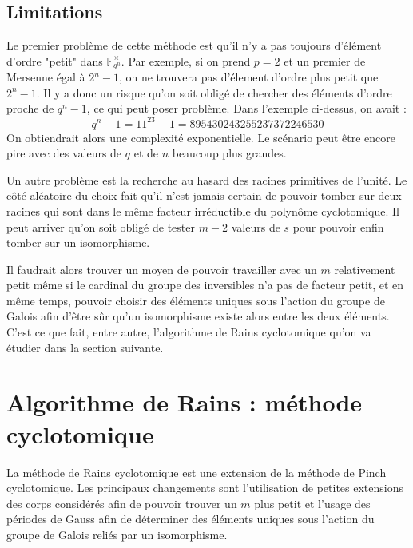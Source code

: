 \documentclass[a4paper]{article} %
\numberwithin{section}{part}
\numberwithin{equation}{section}
\newcommand\GF[1]{\mathbb{F}_{#1}}
\begin{document}
\subsection{Limitations}
Le premier problème de cette méthode est qu'il n'y a pas toujours d'élément
d'ordre "petit" dans $\GF{q^n}^{\times}$. Par exemple, si on prend $p = 2$ et un
premier de Mersenne égal à $2^n - 1$, on ne trouvera pas d'élement d'ordre plus
petit que $2^n - 1$. Il y a donc un risque qu'on soit obligé de chercher des
éléments d'ordre proche de $q^n - 1$, ce qui peut poser problème. Dans l'exemple
ci-dessus, on avait :
\[q^n - 1 = 11^{23} - 1 = 895430243255237372246530\]
On obtiendrait alors une complexité exponentielle. Le scénario peut être encore 
pire avec des valeurs de $q$ et de $n$ beaucoup plus grandes.\par
Un autre problème est la recherche au hasard des racines primitives de l'unité. 
Le côté aléatoire du choix fait qu'il n'est jamais certain de pouvoir tomber sur
deux racines qui sont dans le même facteur irréductible du polynôme
cyclotomique. Il peut arriver qu'on soit obligé de tester $m-2$ valeurs de $s$
pour pouvoir enfin tomber sur un isomorphisme.\par
Il faudrait alors trouver un moyen de pouvoir travailler avec un $m$
relativement petit même si le cardinal du groupe des inversibles n'a pas de
facteur petit, et en même temps, pouvoir choisir des éléments uniques sous
l'action du groupe de Galois afin d'être sûr qu'un isomorphisme existe alors
entre les deux éléments. C'est ce que fait, entre autre, l'algorithme de Rains 
cyclotomique qu'on va étudier dans la section suivante.


\section{Algorithme de Rains : méthode cyclotomique}
La méthode de Rains cyclotomique est une extension de la méthode de Pinch
cyclotomique. Les principaux changements sont l'utilisation de petites
extensions des corps considérés afin de pouvoir trouver un $m$ plus petit et
l'usage des périodes de Gauss afin de déterminer des éléments uniques sous
l'action du groupe de Galois reliés par un isomorphisme.
\end{document}
